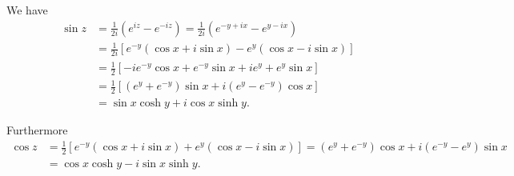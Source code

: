 \documentclass{article}
\begin{document}
\begin{Answer}
We have
\begin{align*}
   \sin z
&= \frac{1}{2i}(e^{iz} - e^{-iz})
 = \frac{1}{2i}(e^{-y + ix} - e^{y - ix}) \\
&= \frac{1}{2i}
     [   e^{-y}(\cos x + i \sin x)
       - e^{y}(\cos x - i \sin x)
     ] \\
&= \frac{1}{2}
     [
       -  i e^{-y} \cos x
       +    e^{-y} \sin x
       +  i e^{y}
       +    e^{y}  \sin x
     ] \\
&= \frac{1}{2}[
       (e^y + e^{-y}) \sin x
    + i(e^y - e^{-y}) \cos x
   ] \\
&= \sin x \cosh y + i \cos x \sinh y.
\end{align*}

Furthermore
\begin{align*}
   \cos z
&= \frac{1}{2}[
     e^{-y}(\cos x + i \sin x)
   + e^{y} (\cos x - i \sin x)
   ]
 = (e^{y} + e^{-y}) \cos x + i (e^{-y} - e^y) \sin x \\
&= \cos x \cosh y - i \sin x \sinh y.
\end{align*}

\end{Answer}
\end{document}
